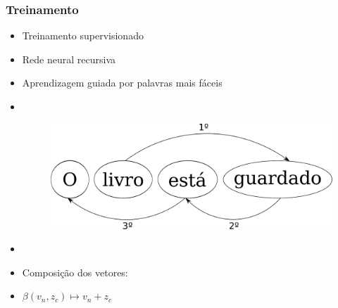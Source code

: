 \documentclass[10pt]{beamer}
\begin{document}
\begin{frame}[fragile]
\frametitle{Treinamento}
  
  \begin{itemize}

    \item Treinamento supervisionado

    \item Rede neural recursiva

    \item Aprendizagem guiada por palavras mais fáceis \cite{shen2007guided}

    \item[\ ] \

    \begin{figure}[htb]
        \begin{center}
            \includegraphics[scale=0.35]{img/guidedlearning.pdf}
        \end{center}
    \end{figure}


    \item[\ ] \

    \item Composição dos vetores:

    \item[\ ] $\beta(v_n, z_c) \mapsto v_n + z_c$ 

  \end{itemize}


\end{frame}
\end{document}
